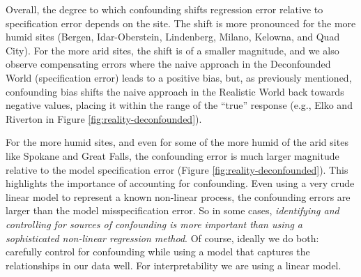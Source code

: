 \documentclass[12pt]{article}
\begin{document}
Overall, the degree to which confounding shifts regression error
relative to specification error depends on the site. The shift is more
pronounced for the more humid sites (Bergen, Idar-Oberstein,
Lindenberg, Milano, Kelowna, and Quad City). For the more arid sites,
the shift is of a smaller magnitude, and we also observe compensating
errors where the naive approach in the Deconfounded World
(specification error) leads to a positive bias, but, as previously
mentioned, confounding bias shifts the naive approach in the Realistic
World back towards negative values, placing it within the range of the
``true'' response (e.g., Elko and Riverton in Figure
\ref{fig:reality-deconfounded}).

For the more humid sites, and even for some of the more humid of the
arid sites like Spokane and Great Falls, the confounding error is much
larger magnitude relative to the model specification error (Figure
\ref{fig:reality-deconfounded}). This highlights the importance of
accounting for confounding. Even using a very crude linear model to
represent a known non-linear process, the confounding errors are
larger than the model misspecification error. So in some cases,
\textit{identifying and controlling for sources of confounding is more
  important than using a sophisticated non-linear regression
  method}. Of course, ideally we do both: carefully control for
confounding while using a model that captures the relationships in our
data well. For interpretability we are using a linear model.
\end{document}
